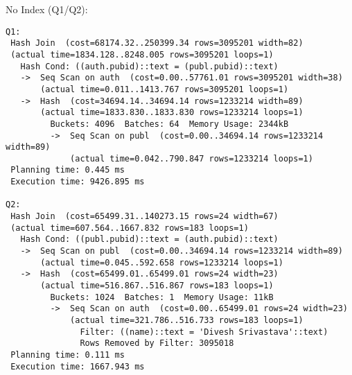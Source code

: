 \documentclass[11pt]{scrartcl}
\begin{document}
\noindent No Index (Q1/Q2):
{\small
\begin{verbatim}
Q1:
 Hash Join  (cost=68174.32..250399.34 rows=3095201 width=82)
 (actual time=1834.128..8248.005 rows=3095201 loops=1)
   Hash Cond: ((auth.pubid)::text = (publ.pubid)::text)
   ->  Seq Scan on auth  (cost=0.00..57761.01 rows=3095201 width=38)
       (actual time=0.011..1413.767 rows=3095201 loops=1)
   ->  Hash  (cost=34694.14..34694.14 rows=1233214 width=89)
       (actual time=1833.830..1833.830 rows=1233214 loops=1)
         Buckets: 4096  Batches: 64  Memory Usage: 2344kB
         ->  Seq Scan on publ  (cost=0.00..34694.14 rows=1233214 width=89)
             (actual time=0.042..790.847 rows=1233214 loops=1)
 Planning time: 0.445 ms
 Execution time: 9426.895 ms

Q2:
 Hash Join  (cost=65499.31..140273.15 rows=24 width=67)
 (actual time=607.564..1667.832 rows=183 loops=1)
   Hash Cond: ((publ.pubid)::text = (auth.pubid)::text)
   ->  Seq Scan on publ  (cost=0.00..34694.14 rows=1233214 width=89)
       (actual time=0.045..592.658 rows=1233214 loops=1)
   ->  Hash  (cost=65499.01..65499.01 rows=24 width=23)
       (actual time=516.867..516.867 rows=183 loops=1)
         Buckets: 1024  Batches: 1  Memory Usage: 11kB
         ->  Seq Scan on auth  (cost=0.00..65499.01 rows=24 width=23)
             (actual time=321.786..516.733 rows=183 loops=1)
               Filter: ((name)::text = 'Divesh Srivastava'::text)
               Rows Removed by Filter: 3095018
 Planning time: 0.111 ms
 Execution time: 1667.943 ms

\end{verbatim}

}
\end{document}
